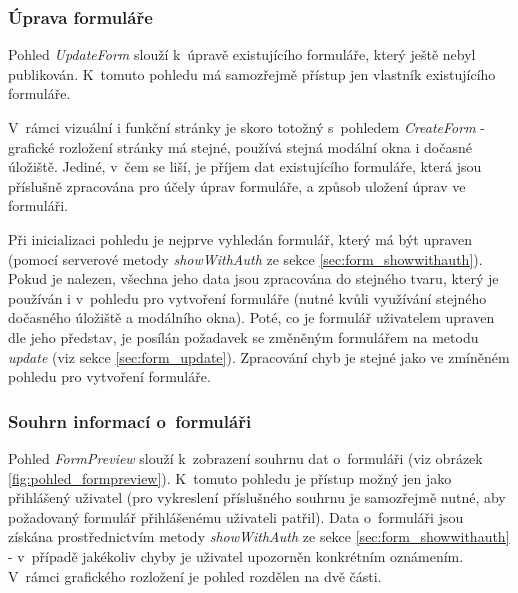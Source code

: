 		\subsubsection{Úprava formuláře}\label{sec:pohled_uprava_formulare} %
		Pohled \textit{UpdateForm} slouží k~úpravě existujícího formuláře, který ještě nebyl publikován. K~tomuto pohledu má samozřejmě přístup jen vlastník existujícího formuláře.
		
		V~rámci vizuální i funkční stránky je skoro totožný s~pohledem \textit{CreateForm} - grafické rozložení stránky má stejné, používá stejná modální okna i dočasné úložiště. Jediné, v~čem se liší, je příjem dat existujícího formuláře, která jsou příslušně zpracována pro účely úprav formuláře, a způsob uložení úprav ve formuláři.
		
		Při inicializaci pohledu je nejprve vyhledán formulář, který má být upraven (pomocí serverové metody \textit{showWithAuth} ze sekce \ref{sec:form_showwithauth}). Pokud je nalezen, všechna jeho data jsou zpracována do stejného tvaru, který je používán i v~pohledu pro vytvoření formuláře (nutné kvůli využívání stejného dočasného úložiště a modálního okna). Poté, co je formulář uživatelem upraven dle jeho představ, je posílán požadavek se změněným formulářem na metodu \textit{update} (viz sekce \ref{sec:form_update}). Zpracování chyb je stejné jako ve zmíněném pohledu pro vytvoření formuláře.
		
		\subsubsection{Souhrn informací o~formuláři}\label{sec:pohled_souhrn_formulare} %
		Pohled \textit{FormPreview} slouží k~zobrazení souhrnu dat o~formuláři (viz obrázek \ref{fig:pohled_formpreview}). K~tomuto pohledu je přístup možný jen jako přihlášený uživatel (pro vykreslení příslušného souhrnu je samozřejmě nutné, aby požadovaný formulář přihlášenému uživateli patřil). Data o~formuláři jsou získána prostřednictvím metody \textit{showWithAuth} ze sekce  \ref{sec:form_showwithauth} - v~případě jakékoliv chyby je uživatel upozorněn konkrétním oznámením. V~rámci grafického rozložení je pohled rozdělen na dvě části. 
		
